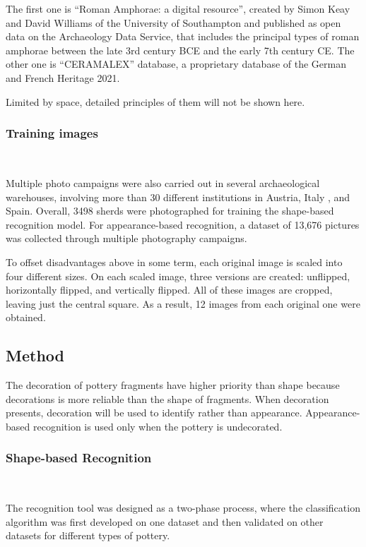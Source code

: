 \documentclass[journal]{IEEEtran}
\begin{document}
	The first one is ``Roman Amphorae: a digital resource''\cite{Roman_Amphorae}, created by Simon Keay and David Williams of the University of Southampton and published as open data on the Archaeology Data Service, that includes the principal types of roman amphorae between the late 3rd century BCE and the early 7th century CE. The other one is “CERAMALEX” database\cite{CERAMALEX}, a proprietary database of the German and French Heritage 2021.
	
	Limited by space, detailed principles of them will not be shown here.
	
	\subsubsection{Training images}
	\ 
	
	Multiple photo campaigns were also carried out in several archaeological warehouses, involving more than 30 different institutions in Austria, Italy , and Spain. Overall, 3498 sherds were photographed for training the shape-based recognition model. For appearance-based recognition, a dataset of 13,676 pictures was collected through multiple photography campaigns.
	
	To offset disadvantages above in some term, each original image is scaled into four different sizes. On each scaled image, three versions are created: unflipped, horizontally flipped, and vertically flipped. All of these images are cropped, leaving just the central square. As a result, 12 images from each original one were obtained.
	
	
	\subsection{Method}\label{method}
	
	The decoration of pottery fragments have higher priority than shape because decorations is more reliable than the shape of fragments. When decoration presents, decoration will be used to identify rather than appearance. Appearance-based recognition is used only when the pottery is undecorated.
	
	\subsubsection{Shape-based Recognition}
	\ 
	
	The recognition tool was designed as a two-phase process, where the classification algorithm was first developed on one dataset and then validated on other datasets for different types of pottery.
	
\end{document}
